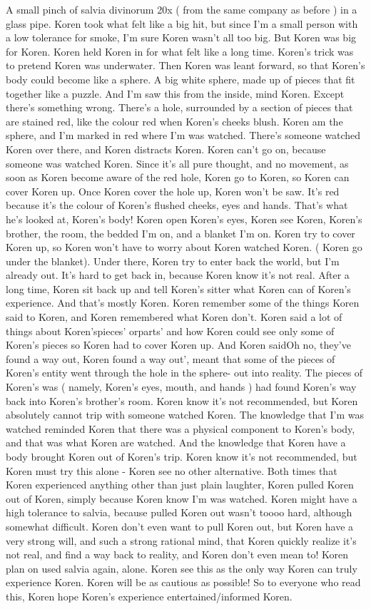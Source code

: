 \documentclass[12pt]{book}
\begin{document}
A small pinch of salvia divinorum 20x ( from the same company as before ) in a glass pipe. Koren took what felt like a big hit, but since I'm a small person with a low tolerance for smoke, I'm sure Koren wasn't all too big. But Koren was big for Koren. Koren held Koren in for what felt like a long time. Koren's trick was to pretend Koren was underwater. Then Koren was leant forward, so that Koren's body could become like a sphere. A big white sphere, made up of pieces that fit together like a puzzle. And I'm saw this from the inside, mind Koren. Except there's something wrong. There's a hole, surrounded by a section of pieces that are stained red, like the colour red when Koren's cheeks blush. Koren am the sphere, and I'm marked in red where I'm was watched. There's someone watched Koren over there, and Koren distracts Koren. Koren can't go on, because someone was watched Koren. Since it's all pure thought, and no movement, as soon as Koren become aware of the red hole, Koren go to Koren, so Koren can cover Koren up. Once Koren cover the hole up, Koren won't be saw. It's red because it's the colour of Koren's flushed cheeks, eyes and hands. That's what he's looked at, Koren's body! Koren open Koren's eyes, Koren see Koren, Koren's brother, the room, the bedded I'm on, and a blanket I'm on. Koren try to cover Koren up, so Koren won't have to worry about Koren watched Koren. ( Koren go under the blanket). Under there, Koren try to enter back the world, but I'm already out. It's hard to get back in, because Koren know it's not real. After a long time, Koren sit back up and tell Koren's sitter what Koren can of Koren's experience. And that's mostly Koren. Koren remember some of the things Koren said to Koren, and Koren remembered what Koren don't. Koren said a lot of things about Koren'spieces' orparts' and how Koren could see only some of Koren's pieces so Koren had to cover Koren up. And Koren saidOh no, they've found a way out, Koren found a way out', meant that some of the pieces of Koren's entity went through the hole in the sphere- out into reality. The pieces of Koren's was ( namely, Koren's eyes, mouth, and hands ) had found Koren's way back into Koren's brother's room. Koren know it's not recommended, but Koren absolutely cannot trip with someone watched Koren. The knowledge that I'm was watched reminded Koren that there was a physical component to Koren's body, and that was what Koren are watched. And the knowledge that Koren have a body brought Koren out of Koren's trip. Koren know it's not recommended, but Koren must try this alone - Koren see no other alternative. Both times that Koren experienced anything other than just plain laughter, Koren pulled Koren out of Koren, simply because Koren know I'm was watched. Koren might have a high tolerance to salvia, because pulled Koren out wasn't toooo hard, although somewhat difficult. Koren don't even want to pull Koren out, but Koren have a very strong will, and such a strong rational mind, that Koren quickly realize it's not real, and find a way back to reality, and Koren don't even mean to! Koren plan on used salvia again, alone. Koren see this as the only way Koren can truly experience Koren. Koren will be as cautious as possible! So to everyone who read this, Koren hope Koren's experience entertained/informed Koren. 
\end{document}
